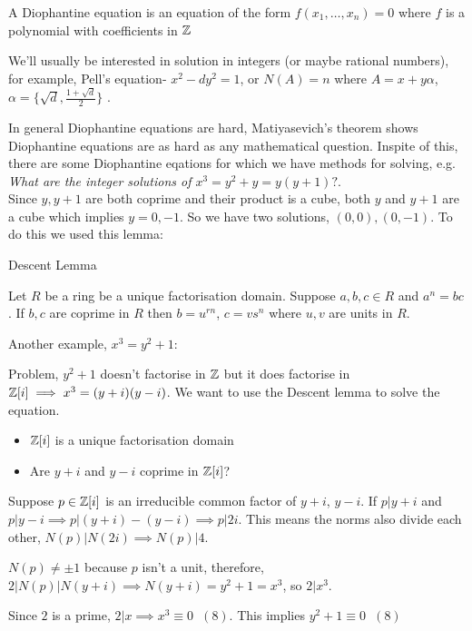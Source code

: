 \documentclass[11pt]{article}
\begin{document}
	\begin{defn}
		A Diophantine equation is an equation of the form $f(x_1, \dots, x_n)=0 $ where $f$ is a polynomial with coefficients in $\mathbb{Z}$ 
	\end{defn}

	We'll usually be interested in solution in integers (or maybe rational numbers), for example, Pell's equation- $x^2 - dy^2 = 1$, or $N(A) = n $ where $A= x + y \alpha $, $\alpha = \{ \sqrt{d},  \frac{1+\sqrt{d}}{2}\}$ .

	In general Diophantine equations are hard, Matiyasevich's theorem shows Diophantine equations are as hard as any mathematical question.
	Inspite of this, there are some Diophantine eqations for which we have methods for solving, e.g. \textit{What are the integer solutions of $x^3 = y^2 + y = y(y+1) ? $}.
	$ $\\[1em]
	Since  $y,y+1$ are both coprime and their product is a cube, both $y$ and $y+1$ are a cube which implies $y=0,-1$. So we have two solutions, $(0,0), (0,-1)$. To do this we used this lemma:


	\begin{lemma}
		Descent Lemma $ $

		Let $R$ be a ring be a unique factorisation domain. Suppose $a,b,c \in R$ and $a^n = bc$. If $b,c$ are coprime in $R$ then $b=u^{rn}$, $ c=vs^n$ where $u,v$ are units in $R$.
	\end{lemma}

Another example, $x^3 = y^2 + 1$:

	Problem, $y^2+1$ doesn't factorise in $\mathbb{Z}$ but it does factorise in $\mathbb{Z}[i] \implies x^3 = (y+i)(y-i)$. We want to use the Descent lemma to solve the equation.
	\begin{itemize}
		\item{$\mathbb{Z}[i]$ is a unique factorisation domain}
		\item{Are $y+i$ and $y-i$ coprime in $\mathbb{Z}[i]$? }
	\end{itemize}
	Suppose $p \in \mathbb{Z}[i]$ is an irreducible common factor of $y+i$, $y-i$. If $p | y+i$ and $p|y-i \implies p|(y+i) - (y-i) \implies p | 2i$. This means the norms also divide each other, $N(p) | N(2i) \implies N(p) | 4 $.

	$N(p) \neq \pm 1$ because $p$ isn't a unit, therefore,  $ 2|N(p)|N(y+i) \implies N(y+i) = y^2+1 = x^3$, so $2| x^3$.

	Since $2$ is a prime, $2|x \implies x^3 \equiv 0 \hspace{7pt} (8)$. This implies $y^2 + 1 \equiv 0\hspace{7pt} (8) $
\end{document}
